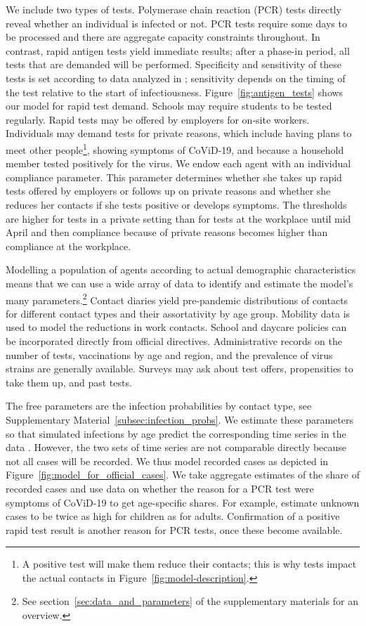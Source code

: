 We include two types of tests. Polymerase chain reaction (PCR) tests directly reveal
whether an individual is infected or not. PCR tests require some days to be processed
and there are aggregate capacity constraints throughout. In contrast, rapid antigen
tests yield immediate results; after a phase-in period, all tests that are demanded will
be performed. Specificity and sensitivity of these tests is set according to data
analyzed in \cite{Bruemmer2021, Smith2021}; sensitivity depends on the timing of the
test relative to the start of infectiousness. Figure~\ref{fig:antigen_tests} shows our
model for rapid test demand. Schools may require students to be tested regularly. Rapid
tests may be offered by employers for on-site workers. Individuals may demand tests for
private reasons, which include having plans to meet other people\footnote{A positive
    test will make them reduce their contacts; this is why tests impact the actual contacts
    in Figure~\ref{fig:model-description}.}, showing symptoms of CoViD-19, and because a
household member tested positively for the virus. We endow each agent with an individual
compliance parameter. This parameter determines whether she takes up rapid tests offered
by employers or follows up on private reasons and whether she reduces her contacts if
she tests positive or develops symptoms. The thresholds are higher for tests in a
private setting than for tests at the workplace until mid April and then compliance
because of private reasons becomes higher than compliance at the workplace.

Modelling a population of agents according to actual demographic characteristics means
that we can use a wide array of data to identify and estimate the model's many
parameters.\footnote{See section~\ref{sec:data_and_parameters} of the supplementary
    materials for an overview.} Contact diaries yield pre-pandemic distributions of contacts
for different contact types and their assortativity by age group. Mobility data is used
to model the reductions in work contacts. School and daycare policies can be
incorporated directly from official directives. Administrative records on the number of
tests, vaccinations by age and region, and the prevalence of virus strains are generally
available. Surveys may ask about test offers, propensities to take them up, and past
tests.

The free parameters are the infection probabilities by contact type, see Supplementary
Material~\ref{subsec:infection_probs}. We estimate these parameters so that  simulated
infections by age predict the corresponding time series in the data \citep[See][for the
general method]{McFadden1989}. However, the two sets of time series are not comparable
directly because not all cases will be recorded. We thus model recorded cases as depicted
in Figure~\ref{fig:model_for_official_cases}. We take aggregate estimates of the share of
recorded cases and use data on whether the reason for a PCR test were symptoms of
CoViD-19 to get age-specific shares. For example, estimate unknown cases to be twice as high for
children as for adults. Confirmation of a positive rapid test result is another reason
for PCR tests, once these become available.

